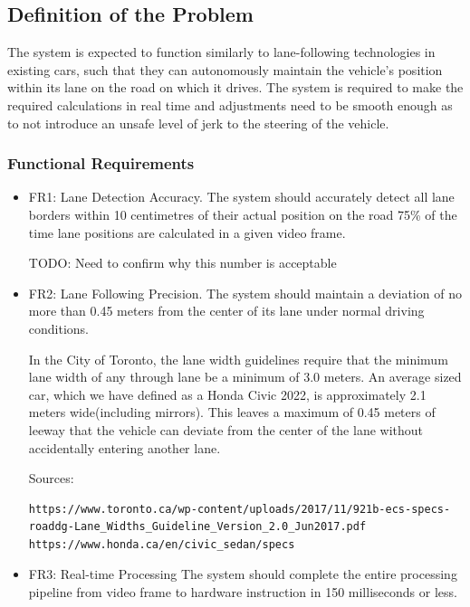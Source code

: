 \documentclass[titlepage]{article}
\begin{document}
\subsection{Definition of the Problem}
The system is expected to function similarly to lane-following technologies in existing cars, such that they can autonomously maintain the vehicle’s position within its lane on the road on which it drives. The system is required to make the required calculations in real time and adjustments need to be smooth enough as to not introduce an unsafe level of jerk to the steering of the vehicle.


\subsubsection{Functional Requirements}
\begin{itemize}
	\item  FR1: Lane Detection Accuracy. The system should accurately detect all lane borders within 10 centimetres of their actual position on the road 75\% of the time lane positions are calculated in a given video frame.

	      TODO: Need to confirm why this number is acceptable

	\item FR2: Lane Following Precision. The system should maintain a deviation of no more than 0.45 meters from the center of its lane under normal driving conditions.

	      In the City of Toronto, the lane width guidelines require that the minimum lane width of any through lane be a minimum of 3.0 meters. An average sized car, which we have defined as a Honda Civic 2022, is approximately 2.1 meters wide(including mirrors). This leaves a maximum of 0.45 meters of leeway that the vehicle can deviate from the center of the lane without accidentally entering another lane.

	      Sources:

	      \begin{verbatim}
https://www.toronto.ca/wp-content/uploads/2017/11/921b-ecs-specs-roaddg-Lane_Widths_Guideline_Version_2.0_Jun2017.pdf
https://www.honda.ca/en/civic_sedan/specs
\end{verbatim}


	\item FR3: Real-time Processing
	      The system should complete the entire processing pipeline from video frame to hardware instruction in 150 milliseconds or less.


\end{itemize}
\end{document}
